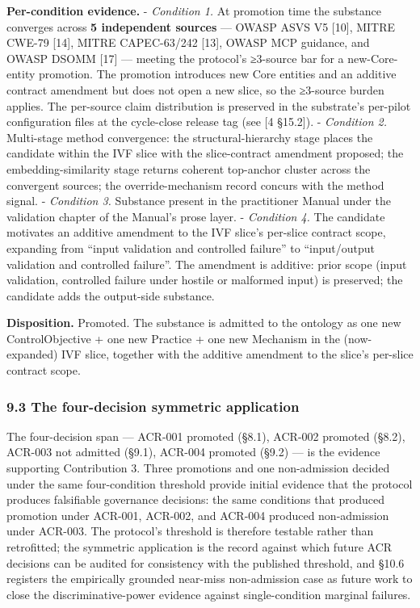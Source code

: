 \documentclass[
]{article}
\begin{document}
\textbf{Per-condition evidence.} - \emph{Condition 1.} At promotion time
the substance converges across \textbf{5 independent sources} --- OWASP
ASVS V5 {[}10{]}, MITRE CWE-79 {[}14{]}, MITRE CAPEC-63/242 {[}13{]},
OWASP MCP guidance, and OWASP DSOMM {[}17{]} --- meeting the protocol's
≥3-source bar for a new-Core-entity promotion. The promotion introduces
new Core entities and an additive contract amendment but does not open a
new slice, so the ≥3-source burden applies. The per-source claim
distribution is preserved in the substrate's per-pilot configuration
files at the cycle-close release tag (see {[}4 §15.2{]}). -
\emph{Condition 2.} Multi-stage method convergence: the
structural-hierarchy stage places the candidate within the IVF slice
with the slice-contract amendment proposed; the embedding-similarity
stage returns coherent top-anchor cluster across the convergent sources;
the override-mechanism record concurs with the method signal. -
\emph{Condition 3.} Substance present in the practitioner Manual under
the validation chapter of the Manual's prose layer. - \emph{Condition
4.} The candidate motivates an additive amendment to the IVF slice's
per-slice contract scope, expanding from ``input validation and
controlled failure'' to ``input/output validation and controlled
failure''. The amendment is additive: prior scope (input validation,
controlled failure under hostile or malformed input) is preserved; the
candidate adds the output-side substance.

\textbf{Disposition.} Promoted. The substance is admitted to the
ontology as one new ControlObjective + one new Practice + one new
Mechanism in the (now-expanded) IVF slice, together with the additive
amendment to the slice's per-slice contract scope.

\subsubsection{9.3 The four-decision symmetric
application}\label{the-four-decision-symmetric-application}

The four-decision span --- ACR-001 promoted (§8.1), ACR-002 promoted
(§8.2), ACR-003 not admitted (§9.1), ACR-004 promoted (§9.2) --- is the
evidence supporting Contribution 3. Three promotions and one
non-admission decided under the same four-condition threshold provide
initial evidence that the protocol produces falsifiable governance
decisions: the same conditions that produced promotion under ACR-001,
ACR-002, and ACR-004 produced non-admission under ACR-003. The
protocol's threshold is therefore testable rather than retrofitted; the
symmetric application is the record against which future ACR decisions
can be audited for consistency with the published threshold, and §10.6
registers the empirically grounded near-miss non-admission case as
future work to close the discriminative-power evidence against
single-condition marginal failures.
\end{document}
